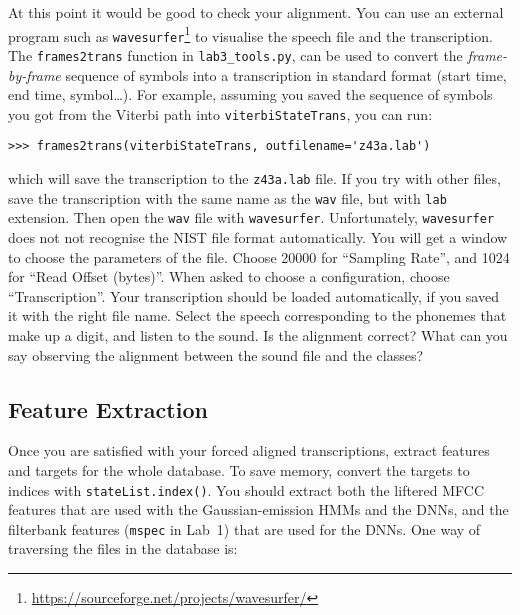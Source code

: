 \documentclass{nada-ten}
\begin{document}
At this point it would be good to check your alignment. You can use an external program such as \texttt{wavesurfer}\footnote{\url{https://sourceforge.net/projects/wavesurfer/}} to visualise the speech file and the transcription. The \texttt{frames2trans} function in \texttt{lab3\_tools.py}, can be used to convert the \textit{frame-by-frame} sequence of symbols into a transcription in standard format (start time, end time, symbol\dots). For example, assuming you saved the sequence of symbols you got from the Viterbi path into \texttt{viterbiStateTrans}, you can run:
\begin{verbatim}
>>> frames2trans(viterbiStateTrans, outfilename='z43a.lab')
\end{verbatim}
which will save the transcription to the \texttt{z43a.lab} file.
If you try with other files, save the transcription with the same name as the \texttt{wav} file, but with \texttt{lab} extension. Then open the \texttt{wav} file with \texttt{wavesurfer}. Unfortunately, \texttt{wavesurfer} does not not recognise the NIST file format automatically. You will get a window to choose the parameters of the file. Choose 20000 for ``Sampling Rate'', and 1024 for ``Read Offset (bytes)''. When asked to choose a configuration, choose ``Transcription''. Your transcription should be loaded automatically, if you saved it with the right file name. Select the speech corresponding to the phonemes that make up a digit, and listen to the sound. Is the alignment correct? What can you say observing the alignment between the sound file and the classes?

\subsection{Feature Extraction}
Once you are satisfied with your forced aligned transcriptions, extract features and targets for the whole database. To save memory, convert the targets to indices with \texttt{stateList.index()}.
You should extract both the liftered MFCC features that are used with the Gaussian-emission HMMs and the DNNs, and the filterbank features (\texttt{mspec} in Lab~1) that are used for the DNNs.
One way of traversing the files in the database is:
\end{document}
